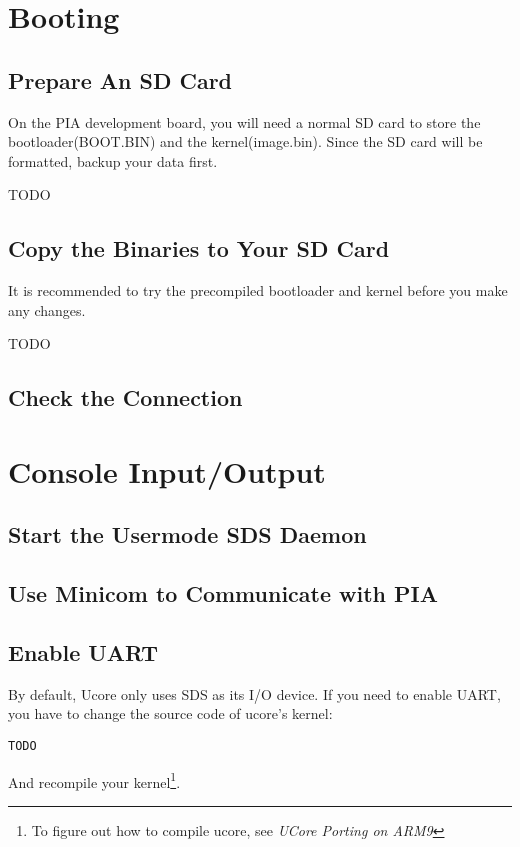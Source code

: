 \documentclass[a4paper]{article}
\begin{document}
\section{Booting}
\subsection{Prepare An SD Card}
On the PIA development board, you will need a normal SD card to store
the bootloader(BOOT.BIN) and the kernel(image.bin).
Since the SD card will be formatted, backup your data first.

TODO

\subsection{Copy the Binaries to Your SD Card}
It is recommended to try the precompiled bootloader and kernel before
you make any changes.

TODO

\subsection{Check the Connection}

\section{Console Input/Output}

\subsection{Start the Usermode SDS Daemon}

\subsection{Use Minicom to Communicate with PIA}

\subsection{Enable UART}
By default, Ucore only uses SDS as its I/O device. If you need
to enable UART, you have to change the source code of ucore's kernel:

\begin{verbatim}
TODO
\end{verbatim}

And recompile your kernel\footnote{To figure out how to compile
ucore, see \emph{UCore Porting on ARM9}}.
\end{document}
